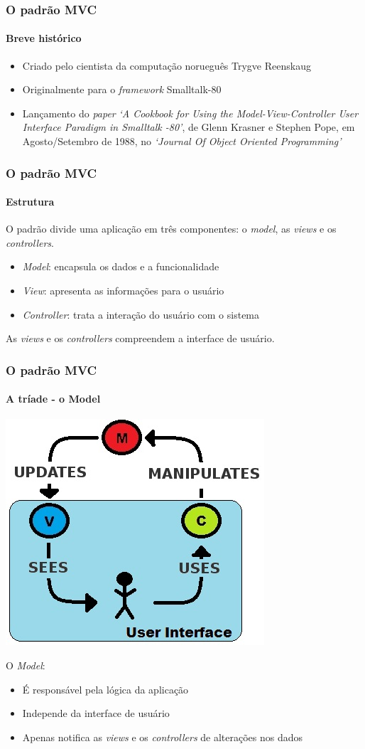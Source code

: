 \documentclass{beamer}
\begin{document}
\begin{frame}
\frametitle{O padrão MVC}
\framesubtitle{Breve histórico}
\begin{itemize}
\item {Criado pelo cientista da computação norueguês Trygve Reenskaug}
\item {Originalmente para o \textit{framework} Smalltalk-80}
\item {Lançamento do \textit{paper} \textit{`A Cookbook for Using the Model-View-Controller User Interface Paradigm in Smalltalk -80'}, de Glenn Krasner e Stephen Pope, em Agosto/Setembro de 1988, no \textit{`Journal Of Object Oriented Programming'}}
\end{itemize}
\end{frame}

\begin{frame}
\frametitle{O padrão MVC}
\framesubtitle{Estrutura}
	O padrão divide uma aplicação em três componentes: o \textit{model}, as \textit{views} e os \textit{controllers}.

\begin{itemize}
	\item \textit{Model}: encapsula os dados e a funcionalidade
	\item \textit{View}: apresenta as informações para o usuário
  \item \textit{Controller}: trata a interação do usuário com o sistema
\end{itemize}

  As \textit{views} e os \emph{controllers} compreendem a interface de usuário.
\end{frame}

\begin{frame}
\frametitle{O padrão MVC}
\framesubtitle{A tríade - o Model}
\begin{center}
	\includegraphics[scale=0.4]{MVC.jpg}
\end{center}
O \textit{Model}:
  \begin{itemize}
    \item {É responsável pela lógica da aplicação}
    \item {Independe da interface de usuário}
    \item {Apenas notifica as \textit{views} e os \textit{controllers} de alterações nos dados}
  \end{itemize}
\end{frame}
\end{document}
